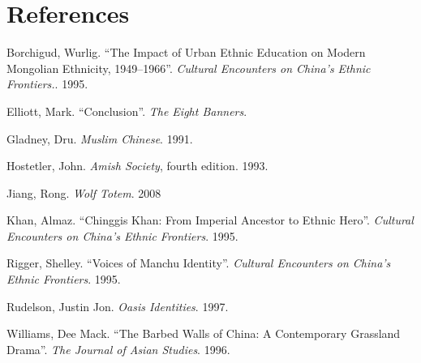 \section*{References}

\bibent Borchigud, Wurlig. ``The Impact of Urban Ethnic Education on Modern
Mongolian Ethnicity, 1949--1966''. \textit{Cultural Encounters on China's Ethnic
Frontiers.}. 1995.

\bibent Elliott, Mark. ``Conclusion''. \textit{The Eight Banners}.

\bibent Gladney, Dru. \textit{Muslim Chinese}. 1991.

\bibent Hostetler, John. \textit{Amish Society}, fourth edition. 1993.

\bibent Jiang, Rong. \textit{Wolf Totem}. 2008

\bibent Khan, Almaz. ``Chinggis Khan: From Imperial Ancestor to Ethnic Hero''.
\textit{Cultural Encounters on China's Ethnic Frontiers}. 1995.

\bibent Rigger, Shelley. ``Voices of Manchu Identity''. \textit{Cultural
Encounters on China's Ethnic Frontiers}. 1995.

\bibent Rudelson, Justin Jon. \textit{Oasis Identities}. 1997.

\bibent Williams, Dee Mack. ``The Barbed Walls of China: A Contemporary
Grassland Drama''. \textit{The Journal of Asian Studies}. 1996.
